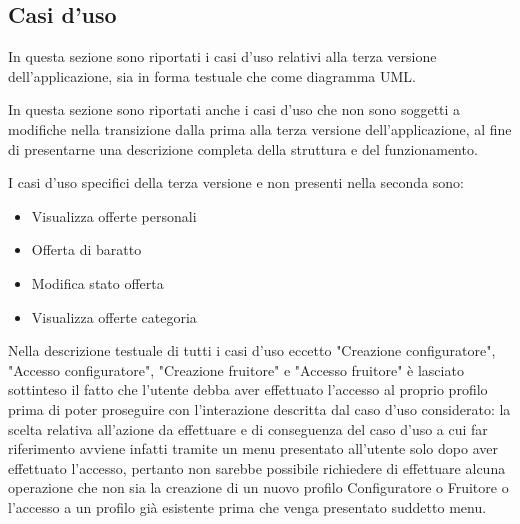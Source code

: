 \subsection{Casi d'uso}
In questa sezione sono riportati i casi d'uso relativi alla terza versione dell'applicazione, sia in forma testuale che come diagramma UML.\bigskip 

In questa sezione sono riportati anche i casi d'uso che non sono soggetti a modifiche nella transizione dalla prima alla terza versione dell'applicazione, al fine di presentarne una descrizione completa della struttura e del funzionamento.\bigskip

I casi d'uso specifici della terza versione e non presenti nella seconda sono:
\begin{itemize}
    \item Visualizza offerte personali
    \item Offerta di baratto
    \item Modifica stato offerta
    \item Visualizza offerte categoria
\end{itemize} \bigskip

Nella descrizione testuale di tutti i casi d'uso eccetto "Creazione configuratore", "Accesso configuratore", "Creazione fruitore" e "Accesso fruitore" è lasciato sottinteso il fatto che l'utente debba aver effettuato l'accesso al proprio profilo prima di poter proseguire con l'interazione descritta dal caso d'uso considerato: la scelta relativa all'azione da effettuare e di conseguenza del caso d'uso a cui far riferimento avviene infatti tramite un menu presentato all'utente solo dopo aver effettuato l'accesso, pertanto non sarebbe possibile richiedere di effettuare alcuna operazione che non sia la creazione di un nuovo profilo Configuratore o Fruitore o l'accesso a un profilo già esistente prima che venga presentato suddetto menu.\bigskip



